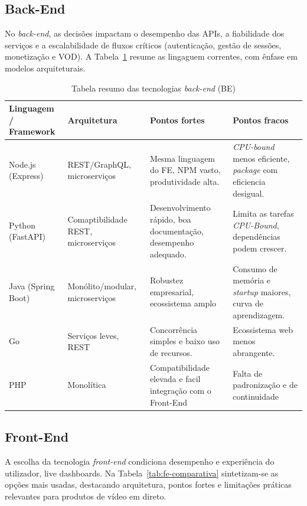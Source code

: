 \subsection{Back-End}

No \textit{back-end}, as decisões impactam o desempenho das APIs, a fiabilidade dos serviços e a escalabilidade de fluxos críticos (autenticação, gestão de sessões, monetização e VOD). A Tabela~\ref{tab:be-comparativa} resume as lingaguem correntes, com ênfase em modelos arquiteturais.


\begin{table}[H]
\caption{Tabela resumo das tecnologias \textit{back-end} (BE)}
\label{tab:be-comparativa}
\begin{center}
\small
\begin{tabular}{|p{2.4cm}|p{2.5cm}|p{4cm}|p{4cm}|}
\hline
\textbf{Linguagem / Framework} & \textbf{Arquitetura} & \textbf{Pontos fortes} & \textbf{Pontos fracos} \\ \hline
Node.js (Express) & REST/GraphQL, microserviços & Mesma linguagem do FE, NPM vasto, 
 produtividade alta. & \textit{CPU-bound} menos eficiente, \textit{package} com eficiencia desigual. \\ \hline
Python (FastAPI) & Comaptibilidade REST, microserviços & Desenvolvimento rápido, boa documentação, desempenho adequado. & Limita as tarefas \textit{CPU-Bound}, dependências podem crescer. \\ \hline
Java (Spring Boot) & Monólito/modular, microserviços & Robustez empresarial, ecossistema amplo & Consumo de memória e \textit{startup} maiores, curva de aprendizagem. \\ \hline
Go & Serviços leves, REST & Concorrência simples e baixo uso de recursos. & Ecossistema web menos abrangente. \\ \hline
PHP & Monolítica & Compatibilidade elevada e facil integração com o Front-End & Falta de padronização e de continuidade \\ \hline
\end{tabular}
\end{center}
\end{table}

\subsection{Front-End}

A escolha da tecnologia \textit{front-end} condiciona desempenho e experiência do utilizador, live dashboards. Na Tabela~\ref{tab:fe-comparativa} sintetizam-se as opções mais usadas, destacando arquitetura, pontos fortes e limitações práticas relevantes para produtos de vídeo em direto.

